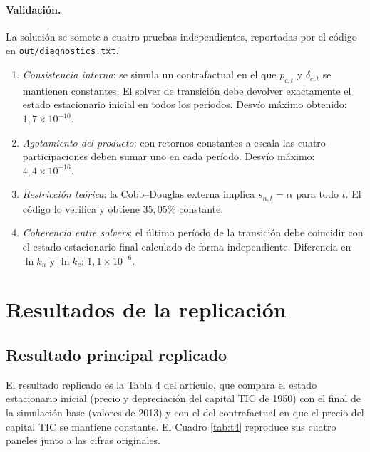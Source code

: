 \documentclass[12pt,letterpaper]{article}
\begin{document}
\paragraph{Validación.}
La solución se somete a cuatro pruebas independientes, reportadas por el código en
\texttt{out/diagnostics.txt}.
\begin{enumerate}\setlength{\itemsep}{0pt}
\item \emph{Consistencia interna}: se simula un contrafactual en el que $p_{c,t}$ y
$\delta_{c,t}$ se mantienen constantes. El solver de transición debe devolver
exactamente el estado estacionario inicial en todos los períodos. Desvío máximo
obtenido: $1{,}7\times10^{-10}$.
\item \emph{Agotamiento del producto}: con retornos constantes a escala las cuatro
participaciones deben sumar uno en cada período. Desvío máximo:
$4{,}4\times10^{-16}$.
\item \emph{Restricción teórica}: la Cobb--Douglas externa implica $s_{n,t}=\alpha$
para todo $t$. El código lo verifica y obtiene $35{,}05\%$ constante.
\item \emph{Coherencia entre solvers}: el último período de la transición debe
coincidir con el estado estacionario final calculado de forma independiente. Diferencia
en $\ln k_{n}$ y $\ln k_{c}$: $1{,}1\times10^{-6}$.
\end{enumerate}

\section{Resultados de la replicación}

\subsection{Resultado principal replicado}

El resultado replicado es la Tabla 4 del artículo, que compara el estado estacionario
inicial (precio y depreciación del capital TIC de 1950) con el final de la simulación
base (valores de 2013) y con el del contrafactual en que el precio del capital TIC se
mantiene constante. El Cuadro \ref{tab:t4} reproduce sus cuatro paneles junto a las
cifras originales.
\end{document}
